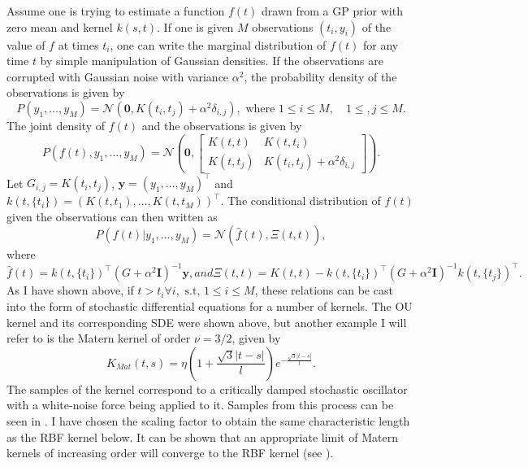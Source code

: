 {Assume one is trying to estimate a function $f(t)$ drawn from a GP prior with zero mean and kernel $k(s,t)$. If one is given $M$
observations $(t_i,y_i)$ of the value of $f$ at times $t_i$, one can write the marginal distribution of $f(t)$ for any time $t$ by simple manipulation of Gaussian densities.
If the observations are corrupted with Gaussian noise with variance $\alpha^2$, the probability density of the observations is given by
\[
P(y_1,\ldots,y_M) = \mathcal{N} (\boldsymbol{0},K(t_i,t_j)+\alpha^2 \delta_{i,j}), \textrm{ where } 1\le i\le M, \quad 1\le, j \le M.
\]
The joint density of $f(t)$ and the observations is given by
\[
P(f(t),y_1,\ldots,y_M)= \mathcal{N} \left(\boldsymbol{0},\left[\begin{array}{cc} K(t,t) & K(t,t_i)\\K(t,t_j)& K(t_i,t_j)+\alpha^2\delta_{i,j}\end{array}\right]\right).
\]
Let $G_{i,j} = K(t_i,t_j)$, $\boldsymbol{y} = (y_1,\ldots,y_M)^\top$ and $k(t,\{t_i\}) = (K(t,t_1),\ldots,K(t,t_M))^\top$.
The conditional distribution of $f(t)$ given the observations can then written as
\[
P(f(t)|y_1,\ldots,y_M) =\mathcal{N}\left(\hat{f}(t), \Xi(t,t)\right),
\]
where
\begin{subequations}
\begin{equation}
\hat{f}(t) = k(t,\{t_i\})^\top (G + \alpha^2 \boldsymbol{I})^{-1} \boldsymbol{y},
\end{equation}
and
\begin{equation}
\Xi(t,t) =  K(t,t) - k(t,\{t_i\})^\top (G+\alpha^2\boldsymbol{I})^{-1} k(t,\{t_j\})^\top.
\end{equation}
\end{subequations}
As I have shown above, if $t> t_i \forall i, \textrm{ s.t, }1\le i\le M$, these relations can be cast into the form of stochastic differential equations for a number of kernels. The OU kernel 
and its corresponding SDE were shown above, but another example I will refer to is the Matern kernel of order $\nu = 3/2$, given by
\[
K_{Mat}(t,s) = \eta\left(1+\frac{\sqrt{3}|t-s|}{l}\right) e^{-\frac{\sqrt{3}|t-s|}{l}}.
\]
The samples of the kernel correspond to a critically damped stochastic oscillator with a white-noise force being applied to it. Samples from this process can be seen in
. I have chosen the scaling factor to obtain the same characteristic length as the RBF kernel below. It can be shown that an appropriate limit of
Matern kernels of increasing order will converge to the RBF kernel (see ).\par

}
